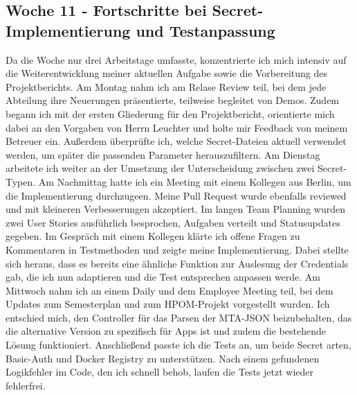 \subsection{Woche 11 - Fortschritte bei Secret-Implementierung und Testanpassung}
Da die Woche nur drei Arbeitstage umfasste, konzentrierte ich mich intensiv auf die Weiterentwicklung meiner aktuellen Aufgabe
sowie die Vorbereitung des Projektberichts.
Am Montag nahm ich am Relase Review teil, bei dem jede Abteilung ihre Neuerungen präsentierte, teilweise begleitet von Demos.
Zudem begann ich mit der ersten Gliederung für den Projektbericht, orientierte mich dabei an den Vorgaben von Herrn Leuchter
und holte mir Feedback von meinem Betreuer ein.
Außerdem überprüfte ich, welche Secret-Dateien aktuell verwendet werden, um später die passenden Parameter herauszufiltern.
Am Dienstag arbeitete ich weiter an der Umsetzung der Unterscheidung zwischen zwei Secret-Typen.
Am Nachmittag hatte ich ein Meeting mit einem Kollegen aus Berlin, um die Implementierung durchzugeen.
Meine Pull Request wurde ebenfalls reviewed und mit kleineren Verbesserungen akzeptiert.
Im langen Team Planning wurden zwei User Stories ausführlich besprochen, Aufgaben verteilt und Statusupdates gegeben.
Im Gespräch mit einem Kollegen klärte ich offene Fragen zu Kommentaren in Testmethoden und zeigte meine Implementierung.
Dabei stellte sich heraus, dass es bereits eine ähnliche Funktion zur Auslesung der Credentials gab, die ich nun adaptieren
und die Test entsprechen anpassen werde.
Am Mittwoch nahm ich an einem Daily und dem Employee Meeting teil, bei dem Updates zum Semesterplan und zum HPOM-Projekt
vorgestellt wurden.
Ich entschied mich, den Controller für das Parsen der MTA-JSON beizubehalten, das die alternative Version zu spezifisch für
Apps ist und zudem die bestehende Lösung funktioniert.
Anschließend passte ich die Tests an, um beide Secret arten, Basic-Auth und Docker Registry zu unterstützen.
Nach einem gefundenen Logikfehler im Code, den ich schnell behob, laufen die Tests jetzt wieder fehlerfrei.

